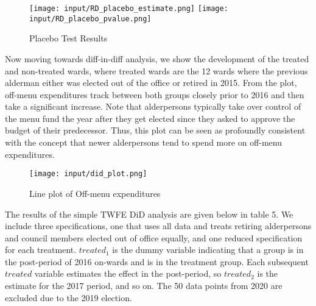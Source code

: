 \begin{figure}[H]
    \centering
    \texttt{[image: input/RD\_placebo\_estimate.png]}
    \texttt{[image: input/RD\_placebo\_pvalue.png]}
    \caption{Placebo Test Results}
\end{figure}

Now moving towards diff-in-diff analysis, we show the development of the treated and non-treated wards, where treated wards are the 12 wards where the previous alderman either was elected out of the office or retired in 2015. 
From the plot, off-menu expenditures track between both groups closely prior to 2016 and then take a significant increase. 
Note that alderpersons typically take over control of the menu fund the year after they get elected \cite{particpatory_budgeting_scrapping} since they asked to approve the budget of their predecessor. 
Thus, this plot can be seen as profoundly consistent with the concept that newer alderpersons tend to spend more on off-menu expenditures. 


\begin{figure}[H]
    \centering
    \texttt{[image: input/did\_plot.png]}
    \caption{Line plot of Off-menu expenditures}
\end{figure}

The results of the simple TWFE DiD analysis are given below in table 5. 
We include three specifications, one that uses all data and treats retiring alderpersons and council members elected out of office equally, and one reduced specification for each treatment. 
$treated_1$ is the dummy variable indicating that a group is in the post-period of 2016 on-wards and is in the treatment group. 
Each subsequent $treated$ variable estimates the effect in the post-period, so $treated_2$ is the estimate for the 2017 period, and so on. 
The 50 data points from 2020 are excluded due to the 2019 election. 

